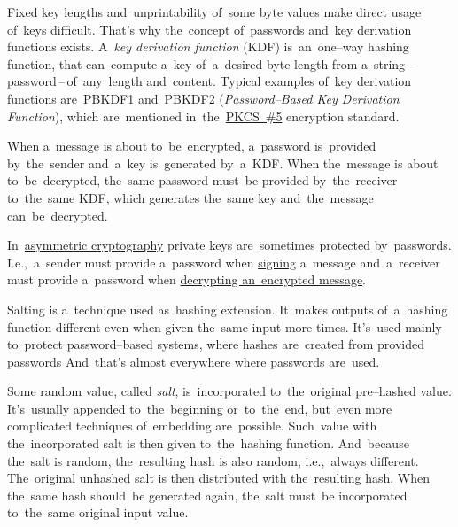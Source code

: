\label{keypassword}
Fixed key lengths and~unprintability of~some byte values make direct usage of~keys difficult.
That's why the~concept of~passwords and~key derivation functions exists.
A~\textit{key derivation function} (KDF) is~an~one--way hashing function, that can~compute a~key of~a~desired byte length from a~string\,--\,password\,--\,of~any~length and~content.
Typical examples of~key derivation functions are~PBKDF1 and~PBKDF2 (\textit{Password--Based Key Derivation Function}), which are~mentioned in~the~\hyperref[pkcs]{PKCS~\#5} encryption standard.

When a~message is about to~be~encrypted, a~password is~provided by~the~sender and~a~key is~generated by~a~KDF\@.
When the~message is about to~be~decrypted, the~same password must~be provided by~the~receiver to~the~same KDF, which generates the~same key and~the~message can~be~decrypted.

In~\hyperref[asymmetriccryptography]{asymmetric cryptography} private keys are~sometimes protected by~passwords.
I.e.,~a~sender must provide a~password when \hyperref[electronicsignature]{signing} a~message and~a~receiver must provide a~password when \hyperref[asymmetriccryptography]{decrypting an~encrypted message}.

\label{salt}
Salting is a~technique used as~hashing extension.
It~makes outputs of~a~hashing function different even when given the~same input more times.
It's~used mainly to~protect password--based systems, where hashes are~created from provided passwords
And~that's almost everywhere where passwords are~used.

Some random value, called \textit{salt}, is~incorporated to~the~original pre--hashed value.
It's~usually appended to~the~beginning or~to~the~end, but~even more complicated techniques of~embedding are~possible.
Such~value with the~incorporated salt is then given to~the~hashing function.
And~because the~salt is random, the~resulting hash is also random, i.e.,~always different.
The~original unhashed salt is then distributed with the~resulting hash.
When the~same hash should~be generated again, the~salt must~be incorporated to~the~same original input value.

